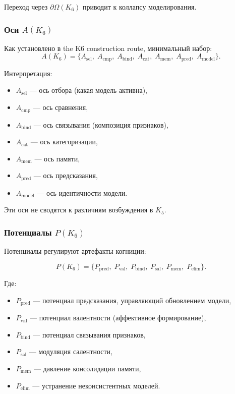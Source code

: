 Переход через $\partial \Omega(K_6)$ приводит к коллапсу моделирования.

\subsubsection{Оси \texorpdfstring{$A(K_6)$}{A(K_6)}}

Как установлено в the K6 construction route, минимальный набор:
\[
A(K_6) = \{
A_{\mathrm{sel}},\;
A_{\mathrm{cmp}},\;
A_{\mathrm{bind}},\;
A_{\mathrm{cat}},\;
A_{\mathrm{mem}},\;
A_{\mathrm{pred}},\;
A_{\mathrm{model}}
\}.
\]

Интерпретация:
\begin{itemize}
    \item $A_{\mathrm{sel}}$ — ось отбора (какая модель активна),
    \item $A_{\mathrm{cmp}}$ — ось сравнения,
    \item $A_{\mathrm{bind}}$ — ось связывания (композиция признаков),
    \item $A_{\mathrm{cat}}$ — ось категоризации,
    \item $A_{\mathrm{mem}}$ — ось памяти,
    \item $A_{\mathrm{pred}}$ — ось предсказания,
    \item $A_{\mathrm{model}}$ — ось идентичности модели.
\end{itemize}

Эти оси не сводятся к различиям возбуждения в $K_5$.

\subsubsection{Потенциалы \texorpdfstring{$P(K_6)$}{P(K_6)}}

Потенциалы регулируют артефакты когниции:

\[
P(K_6)=
\{
P_{\mathrm{pred}},\;
P_{\mathrm{val}},\;
P_{\mathrm{bind}},\;
P_{\mathrm{sal}},\;
P_{\mathrm{mem}},\;
P_{\mathrm{elim}}
\}.
\]

Где:
\begin{itemize}
    \item $P_{\mathrm{pred}}$ — потенциал предсказания, управляющий
          обновлением модели,
    \item $P_{\mathrm{val}}$ — потенциал валентности (аффективное формирование),
    \item $P_{\mathrm{bind}}$ — потенциал связывания признаков,
    \item $P_{\mathrm{sal}}$ — модуляция салентности,
    \item $P_{\mathrm{mem}}$ — давление консолидации памяти,
    \item $P_{\mathrm{elim}}$ — устранение неконсистентных моделей.
\end{itemize}


